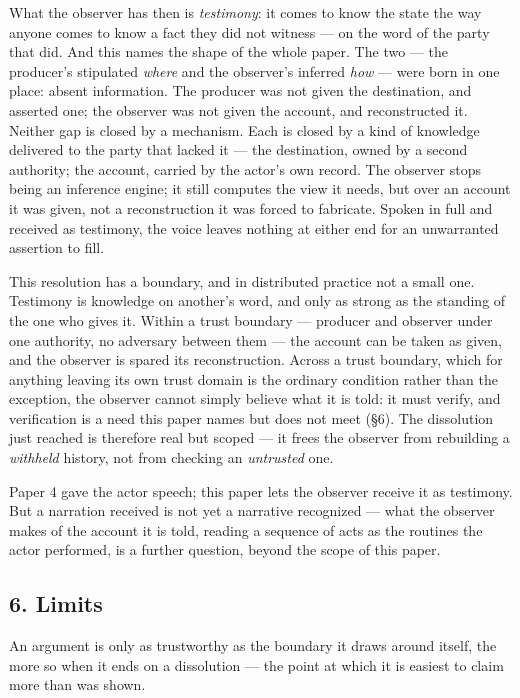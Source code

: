 \documentclass[
]{article}
\begin{document}
What the observer has then is \emph{testimony}: it comes to know the
state the way anyone comes to know a fact they did not witness --- on
the word of the party that did. And this names the shape of the whole
paper. The two --- the producer's stipulated \emph{where} and the
observer's inferred \emph{how} --- were born in one place: absent
information. The producer was not given the destination, and asserted
one; the observer was not given the account, and reconstructed it.
Neither gap is closed by a mechanism. Each is closed by a kind of
knowledge delivered to the party that lacked it --- the destination,
owned by a second authority; the account, carried by the actor's own
record. The observer stops being an inference engine; it still computes
the view it needs, but over an account it was given, not a
reconstruction it was forced to fabricate. Spoken in full and received
as testimony, the voice leaves nothing at either end for an unwarranted
assertion to fill.

This resolution has a boundary, and in distributed practice not a small
one. Testimony is knowledge on another's word, and only as strong as the
standing of the one who gives it. Within a trust boundary --- producer
and observer under one authority, no adversary between them --- the
account can be taken as given, and the observer is spared its
reconstruction. Across a trust boundary, which for anything leaving its
own trust domain is the ordinary condition rather than the exception,
the observer cannot simply believe what it is told: it must verify, and
verification is a need this paper names but does not meet (§6). The
dissolution just reached is therefore real but scoped --- it frees the
observer from rebuilding a \emph{withheld} history, not from checking an
\emph{untrusted} one.

Paper 4 gave the actor speech; this paper lets the observer receive it
as testimony. But a narration received is not yet a narrative recognized
--- what the observer makes of the account it is told, reading a
sequence of acts as the routines the actor performed, is a further
question, beyond the scope of this paper.

\subsection{6. Limits}\label{limits}

An argument is only as trustworthy as the boundary it draws around
itself, the more so when it ends on a dissolution --- the point at which
it is easiest to claim more than was shown.
\end{document}
